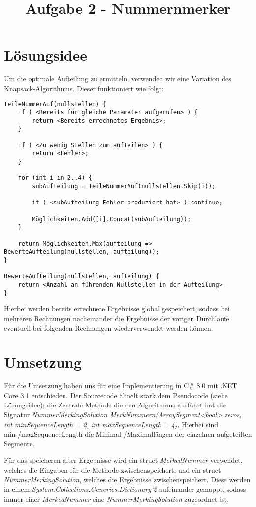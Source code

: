 \documentclass[12pt]{article}
\begin{document}
\title{Aufgabe 2 - Nummernmerker}

\section{Lösungsidee}

Um die optimale Aufteilung zu ermitteln,
verwenden wir eine Variation des Knapsack-Algorithmus.
Dieser funktioniert wie folgt:

\begin{lstlisting}
TeileNummerAuf(nullstellen) {
    if ( <Bereits für gleiche Parameter aufgerufen> ) {
        return <Bereits errechnetes Ergebnis>;
    }
    
    if ( <Zu wenig Stellen zum aufteilen> ) {
    	return <Fehler>;
    }

    for (int i in 2..4) {
        subAufteilung = TeileNummerAuf(nullstellen.Skip(i));

		if ( <subAufteilung Fehler produziert hat> ) continue;
		
        Möglichkeiten.Add([i].Concat(subAufteilung));
    }

    return Möglichkeiten.Max(aufteilung => BewerteAufteilung(nullstellen, aufteilung));
}

BewerteAufteilung(nullstellen, aufteilung) {
    return <Anzahl an führenden Nullstellen in der Aufteilung>;
}
\end{lstlisting}

Hierbei werden bereits errechnete Ergebnisse global gespeichert, sodass bei mehreren Rechnungen nacheinander die Ergebnisse der vorigen Durchläufe eventuell bei folgenden Rechnungen wiederverwendet werden können.

\section{Umsetzung}

Für die Umsetzung haben uns für eine Implementierung in C\# 8.0 mit
.NET Core 3.1 entschieden.
Der Sourcecode ähnelt stark dem Pseudocode (siehe Lösungsidee);
die Zentrale Methode die den Algorithmus ausführt hat die Signatur
\textit{NummerMerkingSolution MerkNummern(ArraySegment<bool> zeros, int minSequenceLength = 2, int maxSequenceLength = 4)}.
Hierbei sind min-/maxSequenceLength die Minimal-/Maximallängen
der einzelnen aufgeteilten Segmente.

Für das speicheren alter Ergebnisse wird ein struct \textit{MerkedNummer}
verwendet, welches die Eingaben für die Methode zwischenspeichert,
und ein struct \textit{NummerMerkingSolution}, welches die Ergebnisse
zwischenspeichert. Diese werden in einem
\textit{System.Collections.Generics.Dictionary`2} aufeinander gemappt,
sodass immer einer \textit{MerkedNummer} eine \textit{NummerMerkingSolution}
zugeordnet ist.
\end{document}
